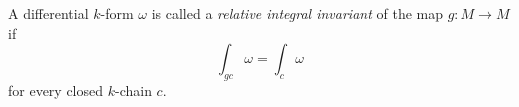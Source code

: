 A differential $k$-form $\omega$ is called a \textit{relative integral invariant} of the map $g: M \rightarrow M$ if
$$\int_{gc} \omega = \int_c \omega$$
for every closed $k$-chain $c$.
